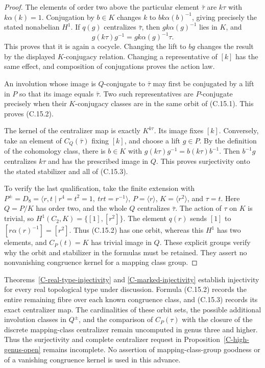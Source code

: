 \begin{proof}
The elements of order two above the particular element
$\bar\tau$ are $k\tau$ with $k\alpha(k)=1$.
Conjugation by $b\in K$ changes $k$ to
$bk\alpha(b)^{-1}$, giving precisely the stated
nonabelian $H^1$. If $q(g)$ centralizes $\bar\tau$, then
$gk\alpha(g)^{-1}$ lies in $K$, and
\[
 g(k\tau)g^{-1}=gk\alpha(g)^{-1}\tau.
\]
This proves that it is again a cocycle. Changing the lift to
$bg$ changes the result by the displayed $K$-conjugacy relation.
Changing a representative of $[k]$ has the same effect, and
composition of conjugations proves the action law.

An involution whose image is $Q$-conjugate to $\bar\tau$ may
first be conjugated by a lift in $P$ so that its image equals
$\bar\tau$. Two such representatives are $P$-conjugate
precisely when their $K$-conjugacy classes are in the same orbit
of (C.15.1). This proves (C.15.2).

The kernel of the centralizer map is exactly $K^{k\tau}$.
Its image fixes $[k]$. Conversely, take an element of $C_Q(\bar\tau)$
fixing $[k]$, and choose a lift $g\in P$. By the definition of
the cohomology class, there is $b\in K$ with
$g(k\tau)g^{-1}=b(k\tau)b^{-1}$. Then $b^{-1}g$ centralizes
$k\tau$ and has the prescribed image in $Q$. This proves
surjectivity onto the stated stabilizer and all of (C.15.3).

To verify the last qualification, take the finite extension with
$P^{\pm}=D_8=\langle r,t\mid r^4=t^2=1,\ trt=r^{-1}\rangle$,
$P=\langle r\rangle$, $K=\langle r^2\rangle$, and $\tau=t$.
Here $Q=P/K$ has order two, and the whole $Q$ centralizes
$\bar\tau$. The action of $\tau$ on $K$ is trivial, so
$H^1(C_2,K)=\{[1],[r^2]\}$. The element $q(r)$ sends $[1]$
to $[r\alpha(r)^{-1}]=[r^2]$. Thus (C.15.2) has one orbit,
whereas this $H^1$ has two elements, and
$C_P(t)=K$ has trivial image in $Q$. These explicit groups
verify why the orbit and stabilizer in the formulas must be
retained. They assert no nonvanishing congruence kernel for a
mapping class group.
\end{proof}

\begin{remark}
Theorems~\ref{C-real-type-injectivity} and
\ref{C-marked-injectivity} establish injectivity for every real
topological type under discussion. Formula (C.15.2) records the
entire remaining fibre over each known congruence class, and
(C.15.3) records its exact centralizer map. The cardinalities of
these orbit sets, the possible additional involution classes in
$Q^{\pm}$, and the comparison of $C_P(\tau)$ with the closure
of the discrete mapping-class centralizer remain uncomputed in
genus three and higher. Thus the surjectivity and complete
centralizer request in Proposition~\ref{C-high-genus-open}
remains incomplete. No assertion of mapping-class-group goodness
or of a vanishing congruence kernel is used in this advance.
\end{remark}

